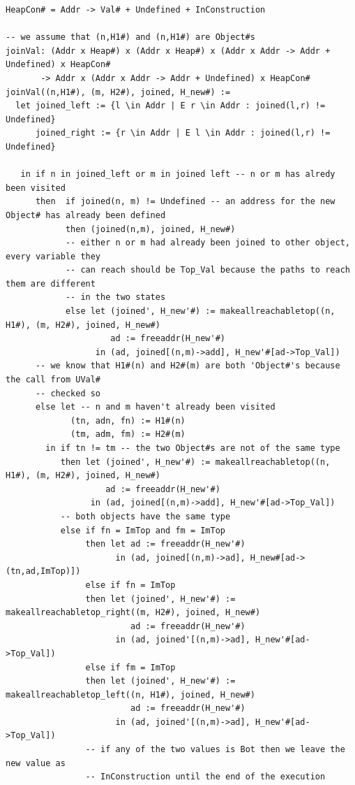 \documentclass[
11pt, %
english, %
singlespacing, %
headsepline, %
]{MastersDoctoralThesis} %
\begin{document}
\begin{verbatim}
HeapCon# = Addr -> Val# + Undefined + InConstruction

-- we assume that (n,H1#) and (n,H1#) are Object#s
joinVal: (Addr x Heap#) x (Addr x Heap#) x (Addr x Addr -> Addr + Undefined) x HeapCon#
       -> Addr x (Addr x Addr -> Addr + Undefined) x HeapCon#
joinVal((n,H1#), (m, H2#), joined, H_new#) :=
  let joined_left := {l \in Addr | E r \in Addr : joined(l,r) != Undefined}
      joined_right := {r \in Addr | E l \in Addr : joined(l,r) != Undefined}

   in if n in joined_left or m in joined left -- n or m has alredy been visited
      then  if joined(n, m) != Undefined -- an address for the new Object# has already been defined
            then (joined(n,m), joined, H_new#)
            -- either n or m had already been joined to other object, every variable they
            -- can reach should be Top_Val because the paths to reach them are different
            -- in the two states
            else let (joined', H_new'#) := makeallreachabletop((n, H1#), (m, H2#), joined, H_new#)
                     ad := freeaddr(H_new'#)
                  in (ad, joined[(n,m)->add], H_new'#[ad->Top_Val])
      -- we know that H1#(n) and H2#(m) are both 'Object#'s because the call from UVal#
      -- checked so
      else let -- n and m haven't already been visited
             (tn, adn, fn) := H1#(n)
             (tm, adm, fm) := H2#(m)
        in if tn != tm -- the two Object#s are not of the same type
           then let (joined', H_new'#) := makeallreachabletop((n, H1#), (m, H2#), joined, H_new#)
                    ad := freeaddr(H_new'#)
                 in (ad, joined[(n,m)->add], H_new'#[ad->Top_Val])
           -- both objects have the same type
           else if fn = ImTop and fm = ImTop
                then let ad := freeaddr(H_new'#)
                      in (ad, joined[(n,m)->ad], H_new#[ad->(tn,ad,ImTop)])
                else if fn = ImTop
                then let (joined', H_new'#) := makeallreachabletop_right((m, H2#), joined, H_new#)
                         ad := freeaddr(H_new'#)
                      in (ad, joined'[(n,m)->ad], H_new'#[ad->Top_Val])
                else if fm = ImTop
                then let (joined', H_new'#) := makeallreachabletop_left((n, H1#), joined, H_new#)
                         ad := freeaddr(H_new'#)
                      in (ad, joined'[(n,m)->ad], H_new'#[ad->Top_Val])
                -- if any of the two values is Bot then we leave the new value as
                -- InConstruction until the end of the execution

\end{verbatim}
\end{document}
